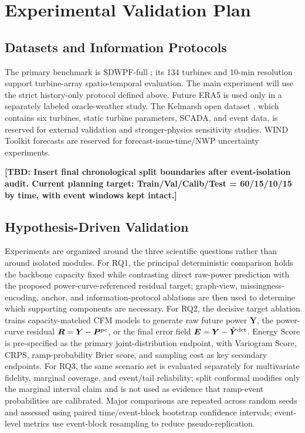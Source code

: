 \documentclass[journal]{IEEEtran}
\newcommand{\TBD}[1]{\textbf{[TBD: #1]}}
\newcommand{\1}{\mathbb{I}}
\begin{document}
\section{Experimental Validation Plan}
\subsection{Datasets and Information Protocols}
The primary benchmark is SDWPF-full \cite{zhou2024sdwpf}; its 134 turbines and 10-min resolution support turbine-array spatio-temporal evaluation. The main experiment will use the strict history-only protocol defined above. Future ERA5 is used only in a separately labeled oracle-weather study. The Kelmarsh open dataset \cite{plumley2025kelmarsh}, which contains six turbines, static turbine parameters, SCADA, and event data, is reserved for external validation and stronger-physics sensitivity studies. WIND Toolkit forecasts \cite{draxl2015windtoolkit} are reserved for forecast-issue-time/NWP uncertainty experiments.

\TBD{Insert final chronological split boundaries after event-isolation audit. Current planning target: Train/Val/Calib/Test = 60/15/10/15 by time, with event windows kept intact.}

\subsection{Hypothesis-Driven Validation}
Experiments are organized around the three scientific questions rather than around isolated modules. For RQ1, the principal deterministic comparison holds the backbone capacity fixed while contrasting direct raw-power prediction with the proposed power-curve-referenced residual target; graph-view, missingness-encoding, anchor, and information-protocol ablations are then used to determine which supporting components are necessary. For RQ2, the decisive target ablation trains capacity-matched CFM models to generate raw future power $\bm Y$, the power-curve residual $\bm R=\bm Y-\bm P^{\rm pc}$, or the final error field $\bm E=\bm Y-\hat{\bm Y}^{\rm det}$. Energy Score is pre-specified as the primary joint-distribution endpoint, with Variogram Score, CRPS, ramp-probability Brier score, and sampling cost as key secondary endpoints. For RQ3, the same scenario set is evaluated separately for multivariate fidelity, marginal coverage, and event/tail reliability; split conformal modifies only the marginal interval claim and is not used as evidence that ramp-event probabilities are calibrated. Major comparisons are repeated across random seeds and assessed using paired time/event-block bootstrap confidence intervals; event-level metrics use event-block resampling to reduce pseudo-replication.
\end{document}
